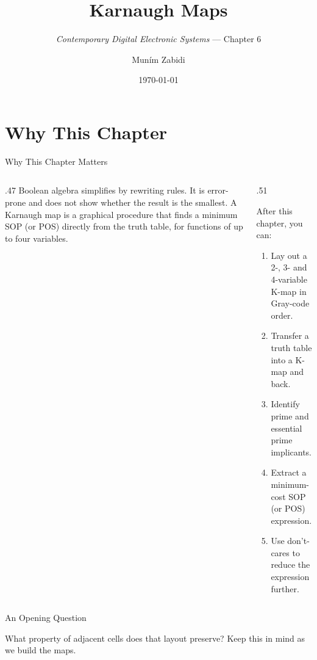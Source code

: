 \documentclass[9pt,aspectratio=169,xcolor=table]{beamer}
\title{Karnaugh Maps}
\subtitle{\emph{Contemporary Digital Electronic Systems} --- Chapter 6}
\author{Mun\'{i}m Zabidi}
\institute{\color{primary}Faculty of Electrical Engineering, Universiti Teknologi Malaysia}
\date{\today}
\begin{document}
\titlepage

\section{Why This Chapter}

\begin{frame}{Why This Chapter Matters}
  \begin{columns}[c]
  \begin{column}{.47\textwidth}
    Boolean algebra simplifies by rewriting rules. It is error-prone and does not show whether the result is the \alert{smallest}. A Karnaugh map is a graphical procedure that finds a minimum SOP (or POS) directly from the truth table, for functions of up to four variables.
  \end{column}
  \begin{column}{.51\textwidth}
    \begin{block}{After this chapter, you can:}
    {\small
    \begin{enumerate}\itemsep2pt
      \item Lay out a 2-, 3- and 4-variable K-map in Gray-code order.
      \item Transfer a truth table into a K-map and back.
      \item Identify prime and essential prime implicants.
      \item Extract a minimum-cost SOP (or POS) expression.
      \item Use don't-cares to reduce the expression further.
    \end{enumerate}}
    \end{block}
  \end{column}
  \end{columns}
\end{frame}

\begin{frame}{An Opening Question}
  \leavevmode\vspace{4mm}
  \begin{center}
  \end{center}
  \vspace{4mm}
  What property of adjacent cells does that layout preserve? Keep this in mind as we build the maps.
\end{frame}
\end{document}
